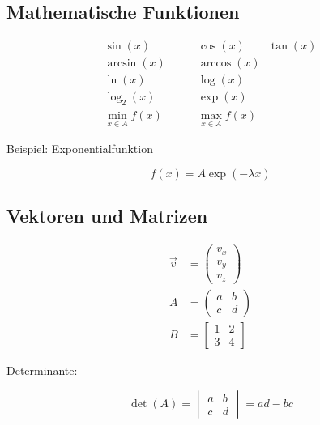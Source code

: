 \documentclass[11pt,a4paper]{scrartcl}
\begin{document}
	\subsection{Mathematische Funktionen}
	
	\begin{align}
		\sin(x) &\qquad \cos(x) \qquad \tan(x)\\
		\arcsin(x) &\qquad \arccos(x)\\
		\ln(x) &\qquad \log(x)\\
		\log_2(x) &\qquad \exp(x)\\
		\min_{x\in A}f(x)
		&\qquad \max_{x\in A}f(x)
	\end{align}
	
	Beispiel: Exponentialfunktion
	
	\begin{equation}
		f(x)=A\exp(-\lambda x)
	\end{equation}
	
	\subsection{Vektoren und Matrizen}
	
	\begin{align}
		\vec{v} &=
		\begin{pmatrix}
			v_x\\
			v_y\\
			v_z
		\end{pmatrix}
		\\[8pt]
		A &=
		\begin{pmatrix}
			a & b\\
			c & d
		\end{pmatrix}
		\\[8pt]
		B &=
		\begin{bmatrix}
			1 & 2\\
			3 & 4
		\end{bmatrix}
	\end{align}
	
	Determinante:
	
	\begin{equation}
		\det(A)=
		\begin{vmatrix}
			a & b\\
			c & d
		\end{vmatrix}
		=ad-bc
	\end{equation}
	
\end{document}

